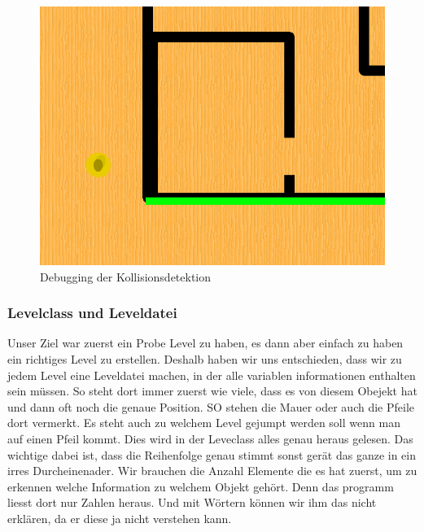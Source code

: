\documentclass[12pt,a4paper]{scrartcl}
\begin{document}
\begin{figure}[h]
\centering
\includegraphics[scale=0.3]{img/kollisionsdetektion.png}
\caption{Debugging der Kollisionsdetektion}
\end{figure}

\subsubsection{Levelclass und Leveldatei}
Unser Ziel war zuerst ein Probe Level zu haben, es dann aber einfach zu haben ein richtiges Level zu erstellen. Deshalb haben wir uns entschieden, dass wir zu jedem Level eine Leveldatei machen, in der alle variablen informationen enthalten sein müssen. So steht dort immer zuerst wie viele, dass es von diesem Obejekt hat und dann oft noch die genaue Position. SO stehen die Mauer oder auch die Pfeile dort vermerkt. Es steht auch zu welchem Level gejumpt werden soll wenn man auf einen Pfeil kommt.
Dies wird in der Leveclass alles genau heraus gelesen. Das wichtige dabei ist, dass die Reihenfolge genau stimmt sonst gerät das ganze in ein irres Durcheinenader. Wir brauchen die Anzahl Elemente die es hat zuerst, um zu erkennen welche Information zu welchem Objekt gehört. Denn das programm liesst dort nur Zahlen heraus. Und mit Wörtern können wir ihm das nicht erklären, da er diese ja nicht verstehen kann. 
\end{document}
